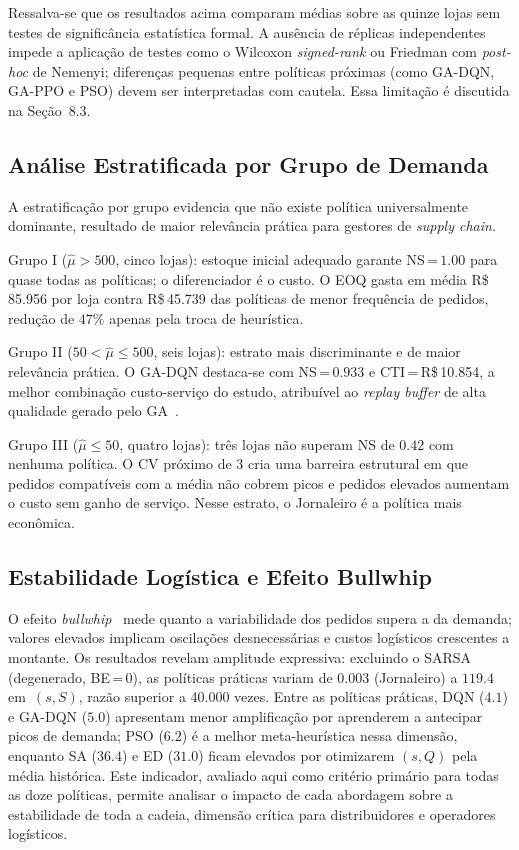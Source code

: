 \documentclass[a4paper,11pt]{article}
\begin{document}
Ressalva-se que os resultados acima comparam médias sobre as quinze
lojas sem testes de significância estatística formal. A ausência de
réplicas independentes impede a aplicação de testes como o Wilcoxon
\textit{signed-rank} ou Friedman com \textit{post-hoc} de Nemenyi;
diferenças pequenas entre políticas próximas (como GA-DQN, GA-PPO
e PSO) devem ser interpretadas com cautela. Essa limitação é
discutida na Seção~8.3.

\subsection{Análise Estratificada por Grupo de Demanda}

A estratificação por grupo evidencia que não existe política
universalmente dominante, resultado de maior relevância prática
para gestores de \textit{supply chain}.

Grupo I ($\hat{\mu} > 500$, cinco lojas): estoque inicial
adequado garante NS\,=\,$1.00$ para quase todas as políticas; o
diferenciador é o custo. O EOQ gasta em média R\$\,85.956 por loja
contra R\$\,45.739 das políticas de menor frequência de pedidos,
redução de $47\%$ apenas pela troca de heurística.

Grupo II ($50 < \hat{\mu} \leq 500$, seis lojas): estrato mais
discriminante e de maior relevância prática. O GA-DQN destaca-se
com NS\,=\,$0.933$ e CTI\,=\,R\$\,10.854, a melhor combinação
custo-serviço do estudo, atribuível ao \textit{replay buffer} de
alta qualidade gerado pelo GA~\citep{oroojlooyjadid:2022}.

Grupo III ($\hat{\mu} \leq 50$, quatro lojas): três lojas
não superam NS de $0.42$ com nenhuma política. O CV próximo de 3
cria uma barreira estrutural em que pedidos compatíveis com a média
não cobrem picos e pedidos elevados aumentam o custo sem ganho de
serviço. Nesse estrato, o Jornaleiro é a política mais econômica.

\subsection{Estabilidade Logística e Efeito Bullwhip}

O efeito \textit{bullwhip}~\citep{lee:1997} mede quanto a
variabilidade dos pedidos supera a da demanda; valores elevados
implicam oscilações desnecessárias e custos logísticos crescentes
a montante. Os resultados revelam amplitude expressiva: excluindo
o SARSA (degenerado, BE\,=\,0), as políticas práticas variam de
$0.003$ (Jornaleiro) a $119.4$ em~$(s,S)$, razão superior a 40.000
vezes. Entre as políticas práticas, DQN ($4.1$) e GA-DQN ($5.0$)
apresentam menor amplificação por aprenderem a antecipar picos de
demanda; PSO ($6.2$) é a melhor meta-heurística nessa dimensão,
enquanto SA ($36.4$) e ED ($31.0$) ficam elevados por otimizarem
$(s,Q)$ pela média histórica. Este indicador, avaliado aqui como
critério primário para todas as doze políticas, permite analisar o
impacto de cada abordagem sobre a estabilidade de toda a cadeia,
dimensão crítica para distribuidores e operadores logísticos.
\end{document}
